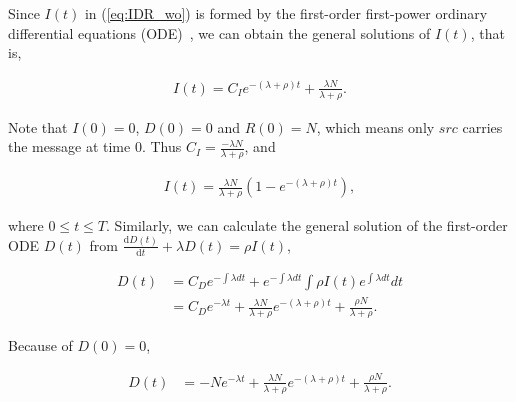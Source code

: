 Since $I(t)$ in (\ref{eq:IDR_wo}) is formed by the first-order first-power
ordinary differential equations (ODE)~\cite{CC2007PerfAnaly},
we can obtain the general solutions of $I(t)$, that is,
\begin{small}
\begin{equation}
\nonumber
\begin{aligned}
I(t) = C_{I} e^{-(\lambda + \rho)t} + \frac{ \lambda N }{ \lambda + \rho }.
\end{aligned}
\end{equation}
\end{small}
Note that $I(0)=0$, $D(0)=0$ and $R(0)=N$,
which means only $src$ carries the message at time $0$.
Thus $C_{I} = \frac{ -\lambda N }{ \lambda + \rho }$, and
\begin{small}
\begin{equation}
\nonumber
\begin{aligned}
I(t) = \frac{ \lambda N }{ \lambda + \rho }(1- e^{-(\lambda + \rho)t}),
\end{aligned}
\end{equation}
\end{small}
where $0 \le t \le T$.
Similarly, we can calculate the general solution of the first-order ODE $D(t)$
from $\frac{\mathrm{d} D(t)}{\mathrm{d} t} + \lambda D(t) = \rho I(t)$,
\begin{small}
\begin{equation}
\label{eq:D_formula}
\begin{aligned}
D(t) &= C_{D} e^{-\int \lambda dt} + e^{-\int \lambda dt} \int \rho I(t) e^{\int \lambda dt} dt \\
&= C_{D} e^{- \lambda t} + \frac{ \lambda N }{ \lambda + \rho } e^{-(\lambda + \rho)t} + \frac{ \rho N }{ \lambda + \rho }.
\end{aligned}
\end{equation}
\end{small}
Because of $D(0)=0$,
\begin{small}
\begin{equation}
\nonumber
\begin{aligned}
D(t) &= -N e^{- \lambda t} + \frac{ \lambda N }{ \lambda + \rho } e^{-(\lambda + \rho)t} + \frac{ \rho N }{ \lambda + \rho }.
\end{aligned}
\end{equation}
\end{small}
